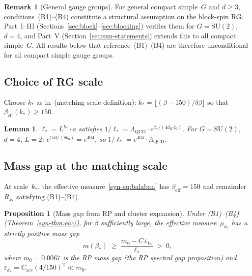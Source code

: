 \documentclass[11pt]{article}
\newtheorem{lemma}[theorem]{Lemma}
\newtheorem{proposition}[theorem]{Proposition}
\theoremstyle{definition}
\newtheorem{remark}[theorem]{Remark}
\newcommand{\SU}{\mathrm{SU}}
\begin{document}
\begin{remark}[General gauge groups]\label{syn-rem:general-G}
For general compact simple~$G$ and $d \geq 3$,
conditions~(B1)--(B4) constitute a structural
assumption on the block-spin RG.  Part~I--III
(Sections~\ref{sec:block}--\ref{sec:blocking})
verifies them for $G = \SU(2)$,
$d = 4$, and Part~V (Section~\ref{sec:sun-statements})
extends this to all
compact simple~$G$.  All results below that
reference~(B1)--(B4) are therefore unconditional
for all compact simple gauge groups.
\end{remark}

\subsection{Choice of RG scale}

Choose $k_*$ as in~(matching scale definition):
$k_* = \lfloor(\beta - 150)/\delta\beta\rfloor$
so that $\beta_{\mathrm{eff}}(k_*) \geq 150$.

\begin{lemma}\label{syn-lem:kstar}
$\ell_* = L^{k_*}\cdot a$ satisfies
$1/\ell_* = \Lambda_{\mathrm{QCD}}\cdot e^{\beta_*/(4d_R\,b_0)}$.
For $G = \SU(2)$, $d = 4$, $L = 2$:
$e^{150/(8b_0)} = e^{404}$, so $1/\ell_*
= e^{404}\cdot\Lambda_{\mathrm{QCD}}$.
\end{lemma}

\subsection{Mass gap at the matching scale}

At scale~$k_*$, the effective measure~\eqref{syn-eq:balaban}
has $\beta_{\mathrm{eff}} = 150$ and remainder~$R_{k_*}$
satisfying (B1)--(B4).

\begin{proposition}[Mass gap from RP and cluster expansion]
\label{syn-prop:perturbed_dob}
Under (B1)--(B4) (Theorem~\ref{syn-thm:eac}), for $\beta$ sufficiently
large, the effective measure~$\mu_{k_*}$ has a strictly positive
mass gap
\begin{equation}
  m(\beta_*) \;\geq\;
  \frac{m_0 - C\,\varepsilon_{k_*}}{\ell_*}
  \;>\; 0,
\end{equation}
where $m_0 = 0.0067$ is the RP mass gap
\textup{(the RP spectral gap proposition)} and
$\varepsilon_{k_*} = C_{\mathrm{acc}}(4/150)^2
\ll m_0$.
\end{proposition}
\end{document}
